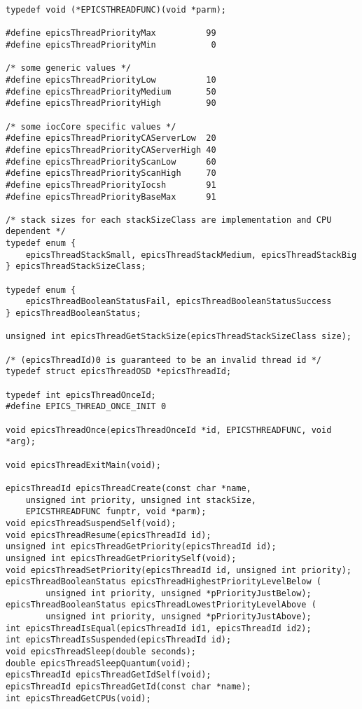 \begin{verbatim}
typedef void (*EPICSTHREADFUNC)(void *parm);

#define epicsThreadPriorityMax          99
#define epicsThreadPriorityMin           0

/* some generic values */
#define epicsThreadPriorityLow          10
#define epicsThreadPriorityMedium       50
#define epicsThreadPriorityHigh         90

/* some iocCore specific values */
#define epicsThreadPriorityCAServerLow  20
#define epicsThreadPriorityCAServerHigh 40
#define epicsThreadPriorityScanLow      60
#define epicsThreadPriorityScanHigh     70
#define epicsThreadPriorityIocsh        91
#define epicsThreadPriorityBaseMax      91

/* stack sizes for each stackSizeClass are implementation and CPU dependent */
typedef enum {
    epicsThreadStackSmall, epicsThreadStackMedium, epicsThreadStackBig
} epicsThreadStackSizeClass;

typedef enum {
    epicsThreadBooleanStatusFail, epicsThreadBooleanStatusSuccess
} epicsThreadBooleanStatus;

unsigned int epicsThreadGetStackSize(epicsThreadStackSizeClass size);

/* (epicsThreadId)0 is guaranteed to be an invalid thread id */
typedef struct epicsThreadOSD *epicsThreadId;

typedef int epicsThreadOnceId;
#define EPICS_THREAD_ONCE_INIT 0

void epicsThreadOnce(epicsThreadOnceId *id, EPICSTHREADFUNC, void *arg);

void epicsThreadExitMain(void);

epicsThreadId epicsThreadCreate(const char *name,
    unsigned int priority, unsigned int stackSize,
    EPICSTHREADFUNC funptr, void *parm);
void epicsThreadSuspendSelf(void);
void epicsThreadResume(epicsThreadId id);
unsigned int epicsThreadGetPriority(epicsThreadId id);
unsigned int epicsThreadGetPrioritySelf(void);
void epicsThreadSetPriority(epicsThreadId id, unsigned int priority);
epicsThreadBooleanStatus epicsThreadHighestPriorityLevelBelow (
        unsigned int priority, unsigned *pPriorityJustBelow);
epicsThreadBooleanStatus epicsThreadLowestPriorityLevelAbove (
        unsigned int priority, unsigned *pPriorityJustAbove);
int epicsThreadIsEqual(epicsThreadId id1, epicsThreadId id2);
int epicsThreadIsSuspended(epicsThreadId id);
void epicsThreadSleep(double seconds);
double epicsThreadSleepQuantum(void);
epicsThreadId epicsThreadGetIdSelf(void);
epicsThreadId epicsThreadGetId(const char *name);
int epicsThreadGetCPUs(void);


\end{verbatim}

